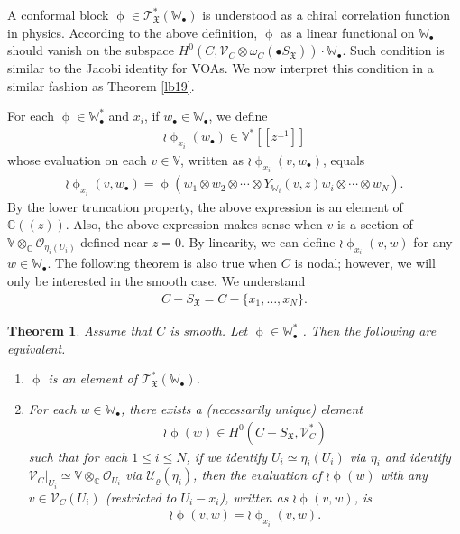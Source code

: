 \documentclass[12pt,b5paper,notitlepage]{report}
\theoremstyle{definition}
\theoremstyle{plain}
\newtheorem{thm}[df]{Theorem}
\newcommand{\fk}{\mathfrak}
\newcommand{\mc}{\mathcal}
\newcommand{\scr}{\mathscr}
\newcommand{\SX}{S_{\fk X}}
\newcommand{\blt}{\bullet}
\newcommand{\Vbb}{\mathbb V}
\newcommand{\Wbb}{\mathbb W}
\newcommand{\Cbb}{\mathbb C}
\numberwithin{equation}{section}
\begin{document}
A conformal block $\upphi\in \scr T_{\fk X}^*(\Wbb_\blt)$ is understood as a chiral correlation function in physics. According to the above definition, $\upphi$ as a linear functional on $\Wbb_\blt$ should vanish on the subspace $H^0(C,\scr V_C\otimes\omega_C(\blt S_{\fk X}))\cdot \Wbb_\blt$. Such condition is similar to the Jacobi identity for VOAs. We now  interpret this condition in a similar fashion as Theorem \ref{lb19}. 

For each $\upphi\in \Wbb_\blt^*$ and $x_i$,  if $w_\blt\in \Wbb_\blt$, we define
\begin{align*}
\wr\upphi_{x_i}(w_\blt)\in \Vbb^*[[z^{\pm1}]]
\end{align*}
whose evaluation on each $v\in \Vbb$, written as $\wr\upphi_{x_i}(v,w_\blt)$, equals
\begin{align}
\wr\upphi_{x_i}(v,w_\blt)=\upphi(w_1\otimes w_2\otimes\cdots\otimes Y_{\Wbb_i}(v,z)w_i\otimes\cdots\otimes w_N).\label{eq125}
\end{align}
By the lower truncation property, the above expression is an element of $\Cbb((z))$. Also, the above expression makes sense when $v$ is a section of $\Vbb\otimes_{\Cbb}\scr O_{\eta_i(U_i)}$ defined near $z=0$. By linearity, we can define $\wr\upphi_{x_i}(v,w)$ for any $w\in\Wbb_\blt$. The following theorem is also true when $C$ is nodal; however, we will only be interested in the smooth case. We \index{CS@$C-\SX,\mc C-\SX,E-\SX$} understand
\begin{align*}
C-\SX=C-\{x_1,\dots,x_N\}.
\end{align*}


\begin{thm}\label{lb32}
Assume that $C$ is smooth. Let $\upphi\in \Wbb_\blt^*$ . Then the following are equivalent.
\begin{enumerate}[label=(\alph*)]
\item $\upphi$ is an element of $\scr T_{\fk X}^*(\Wbb_\blt)$. 
\item For each $w\in\Wbb_\blt$, there exists a (necessarily unique) element 
\begin{align}
\wr\upphi(w)\in H^0(C-S_{\fk X},\scr V_C^*)\label{eq119}
\end{align}
such that for each $1\leq i\leq N$, if we identify $U_i\simeq \eta_i(U_i)$ via $\eta_i$ and identify $\scr V_C|_{U_i}\simeq\Vbb\otimes_\Cbb\scr O_{U_i}$ via $\mc U_\varrho(\eta_i)$, then the evaluation of $\wr\upphi(w)$ with any $v\in\scr V_C(U_i)$ (restricted to $U_i-x_i$), written as $\wr\upphi(v,w)$, is
\begin{align}
\wr\upphi(v,w)=\wr\upphi_{x_i}(v,w).\label{eq229}
\end{align}
\end{enumerate}	
\end{thm}
\end{document}
